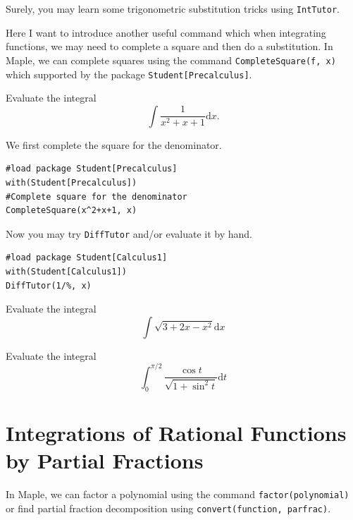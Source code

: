 \documentclass[en,11pt,simple]{elegantbook}
\let\BeginKnitrBlock\begin \let\EndKnitrBlock\end
\begin{document}
Surely, you may learn some trigonometric substitution tricks using \texttt{IntTutor}.

Here I want to introduce another useful command which when integrating functions, we may need to complete a square and then do a substitution. In Maple, we can complete squares using the command \texttt{CompleteSquare(f,\ x)} which supported by the package \texttt{Student{[}Precalculus{]}}.

\BeginKnitrBlock{example}{}{}
\protect\hypertarget{exm:unnamed-chunk-204}{}{\label{exm:unnamed-chunk-204} }
Evaluate the integral
\[
\int\dfrac{1}{x^2+x+1} \mathrm{d} x.
\]
\EndKnitrBlock{example}

\BeginKnitrBlock{solution}{}{}
{}

We first complete the square for the denominator.

\begin{verbatim}
#load package Student[Precalculus]
with(Student[Precalculus])
#Complete square for the denominator
CompleteSquare(x^2+x+1, x)
\end{verbatim}

Now you may try \texttt{DiffTutor} and/or evaluate it by hand.

\begin{verbatim}
#load package Student[Calculus1]
with(Student[Calculus1])
DiffTutor(1/%, x)
\end{verbatim}
\EndKnitrBlock{solution}

\BeginKnitrBlock{exercise}{}{}
\protect\hypertarget{exr:unnamed-chunk-206}{}{\label{exr:unnamed-chunk-206} }
Evaluate the integral
\[
\int \sqrt{3+2 x-x^{2}} \mathrm{d} x
\]
\EndKnitrBlock{exercise}

\BeginKnitrBlock{exercise}{}{}
\protect\hypertarget{exr:unnamed-chunk-207}{}{\label{exr:unnamed-chunk-207} }
Evaluate the integral
\[
\int_{0}^{\pi / 2} \frac{\cos t}{\sqrt{1+\sin ^{2} t}} \mathrm{d} t
\]
\EndKnitrBlock{exercise}

\hypertarget{integrations-of-rational-functions-by-partial-fractions}{%
\section{Integrations of Rational Functions by Partial Fractions}\label{integrations-of-rational-functions-by-partial-fractions}}

In Maple, we can factor a polynomial using the command \texttt{factor(polynomial)} or find partial fraction decomposition using \texttt{convert(function,\ parfrac)}.
\end{document}
